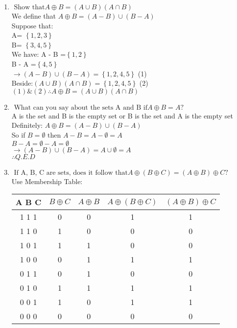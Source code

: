 \documentclass[10pt]{article}
\begin{document}
\begin{enumerate}
\item $ \mbox{ Show that} A \oplus B = (A \cup B)(A \cap B)$\\
We define that $A \oplus B =(A - B) \cup (B - A)$\\
Suppose that:\\
A= $\left\{1,2,3\right\}$\\
B= $\left\{3,4,5\right\}$\\
We have: A - B =$\left\{1,2\right\}$\\
              B - A =$\left\{4,5\right\}$\\
$\rightarrow (A - B) \cup (B - A) = \left\{1,2,4,5\right\}$ (1) \\
Beside:$(A \cup B)(A \cap B) = \left\{1,2,4,5\right\}$ (2) \\
$(1) \& (2) \therefore  A \oplus B = (A \cup B)(A \cap B)$
\item $ \mbox{ What can you say about the sets A and B if} A \oplus B = A?$\\
A is the set and B is the empty set or B is the set and A is the empty set\\
Definitely: $A \oplus B = (A - B) \cup (B - A)$\\
So if $B = \emptyset \mbox{ then } A - B = A - \emptyset = A$\\
       $B - A = \emptyset - A = \emptyset $\\
$\rightarrow (A - B) \cup (B - A) = A \cup \emptyset = A$\\
$\therefore Q.E.D$
\item $ \mbox{ If A, B, C are sets, does it follow that} A \oplus (B \oplus C) = (A \oplus B) \oplus C?$\\
Use Membership Table:
\begin{center}
   \begin{tabular}{|c|c|c|c|c|}
    \hline
    A B C & \quad $B \oplus C$ & \quad $A \oplus B$ & \quad $A \oplus (B \oplus C)$ & \quad $(A \oplus B) \oplus C$\\
     \hline
     1 1 1 & 0 & 0 & 1 &1\\
     1 1 0 & 1 & 0 & 0 &0\\
     1 0 1 & 1 & 1 & 0 &0\\
     1 0 0 & 0 & 1 & 1 &1\\
     0 1 1 & 0 & 1 & 0 &0\\
     0 1 0 & 1 & 1 & 1 &1\\
     0 0 1 & 1 & 0 & 1 &1\\
     0 0 0 & 0 & 0 & 0 &0\\
     \hline
    \end{tabular}
\end{center}
\end{enumerate}
\end{document}
